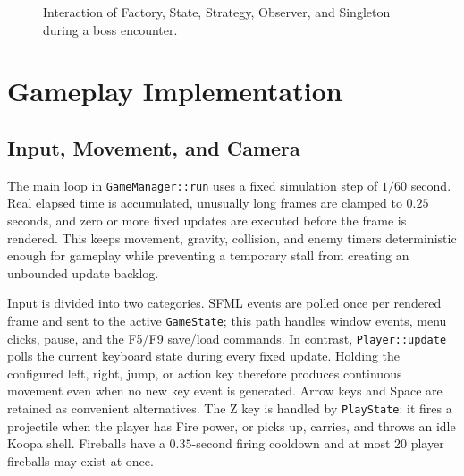 \documentclass{template}
\begin{document}
\begin{figure}[H]
{}
    \caption{Interaction of Factory, State, Strategy, Observer, and Singleton
    during a boss encounter.}
    \label{fig:pattern-interaction}
\end{figure}

\section{Gameplay Implementation}

\subsection{Input, Movement, and Camera}

The main loop in \texttt{GameManager::run} uses a fixed simulation step of
$1/60$ second. Real elapsed time is accumulated, unusually long frames are
clamped to $0.25$ seconds, and zero or more fixed updates are executed before
the frame is rendered. This keeps movement, gravity, collision, and enemy
timers deterministic enough for gameplay while preventing a temporary stall
from creating an unbounded update backlog.

Input is divided into two categories. SFML events are polled once per rendered
frame and sent to the active \texttt{GameState}; this path handles window
events, menu clicks, pause, and the F5/F9 save/load commands. In contrast,
\texttt{Player::update} polls the current keyboard state during every fixed
update. Holding the configured left, right, jump, or action key therefore
produces continuous movement even when no new key event is generated. Arrow
keys and Space are retained as convenient alternatives. The Z key is handled
by \texttt{PlayState}: it fires a projectile when the player has Fire power,
or picks up, carries, and throws an idle Koopa shell. Fireballs have a
$0.35$-second firing cooldown and at most 20 player fireballs may exist at
once.
\end{document}
